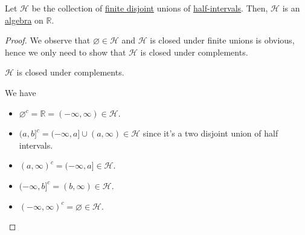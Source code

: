 \begin{lemma}
	Let \(\mathcal{H} \) be the collection of \underline{finite disjoint} unions of \hyperref[def:half-intervals]{half-intervals}. Then, \(\mathcal{H} \) is an \hyperref[def:algebra]{algebra} on \(\mathbb{R} \).
\end{lemma}
\begin{proof}
	We observe that \(\varnothing \in \mathcal{H} \) and \(\mathcal{H} \) is closed under finite unions is obvious, hence we only need to show that \(\mathcal{H} \) is closed under complements.
	\begin{claim}
		\(\mathcal{H} \) is closed under complements.
	\end{claim}
	\begin{explanation}
		We have
		\begin{itemize}
			\item \(\varnothing ^{c} = \mathbb{R} = (-\infty , \infty )\in \mathcal{H}\).
			\item \((a, b]^{c} = (-\infty , a] \cup (a, \infty )\in\mathcal{H} \) since it's a two disjoint union of half intervals.
			\item \((a, \infty )^{c} = (-\infty , a]\in\mathcal{H}\).
			\item \((-\infty , b]^{c} = (b, \infty )\in\mathcal{H} \).
			\item \((-\infty , \infty )^{c} = \varnothing \in\mathcal{H}\).
		\end{itemize}
	\end{explanation}
\end{proof}

